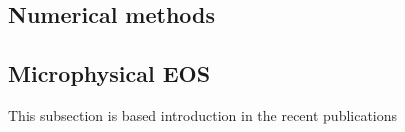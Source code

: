 



%
%
%




\subsection{Numerical methods}
















\subsection{Microphysical EOS}



This subsection is based introduction in the recent publications 
\cite{Radice:2018pdn,Perego:2019adq,Bernuzzi:2020txg,Nedora:2020pak}

